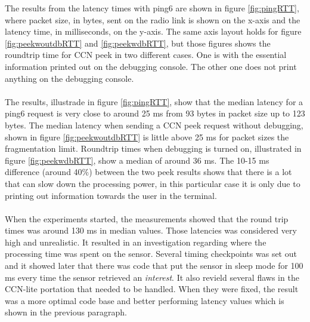 The results from the latency times with ping6 are shown in figure \ref{fig:pingRTT}, where packet size, in bytes, sent on the radio link is shown on the x-axis and the latency time, in milliseconds, on the y-axis. The same axis layout holds for figure \ref{fig:peekwoutdbRTT} and \ref{fig:peekwdbRTT}, but those figures shows the roundtrip time for CCN peek in two different cases. One is with the essential information printed out on the debugging console. The other one does not print anything on the debugging console. \\\\
The results, illustrade in figure \ref{fig:pingRTT}, show that the median latency for a ping6 request is very close to around 25 ms from 93 bytes in packet size up to 123 bytes. The median latency when sending a CCN peek request without debugging, shown in figure \ref{fig:peekwoutdbRTT} is little above 25 ms for packet sizes the fragmentation limit. Roundtrip times when debugging is turned on, illustrated in figure \ref{fig:peekwdbRTT}, show a median of around 36 ms. The 10-15 ms difference (around 40$\%$) between the two peek results shows that there is a lot that can slow down the processing power, in this particular case it is only due to printing out information towards the user in the terminal.\\\\
When the experiments started, the measurements showed that the round trip times was around 130 ms in median values. Those latencies was considered very high and unrealistic. It resulted in an investigation regarding where the processing time was spent on the sensor. Several timing checkpoints was set out and it showed later that there was code that put the sensor in sleep mode for 100 ms every time the sensor retrieved an \textit{interest}. It also revield several flaws in the CCN-lite portation that needed to be handled. When they were fixed, the result was a more optimal code base and better performing latency values which is shown in the previous paragraph.\\\\

